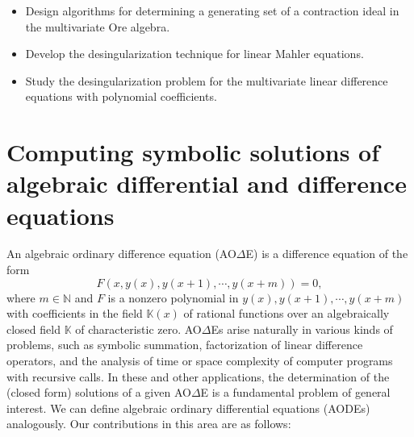 \documentclass[10pt,a4paper]{article}
\newcommand{\bK}{ {\mathbb  K}}
\newcommand{\AODE}{{AO{$\Delta$}E}}
\begin{document}
\begin{itemize}
\item Design algorithms for determining a generating set of a contraction ideal in the multivariate Ore algebra.

\item Develop the desingularization technique for linear Mahler equations. 

\item Study the desingularization problem for the multivariate linear difference equations with polynomial coefficients. 
\end{itemize}

\section*{Computing symbolic solutions of algebraic differential and difference equations}

An algebraic ordinary difference equation ({\AODE}) is a difference equation of the form
\[
F(x, y(x), y(x + 1), \cdots, y(x + m))=0,
\]
where $m \in \mathbb{N}$ and $F$ is a nonzero polynomial in $y(x), y(x + 1), \cdots, y(x + m)$ with coefficients in the field $\bK(x)$ of rational functions over an algebraically closed field $\bK$ of characteristic zero.
{\AODE}s arise naturally in various kinds of problems, such as symbolic summation, 
factorization of linear difference operators, and the 
analysis of time or space complexity of computer programs with recursive calls. 
In these and other applications, the determination of the (closed form) solutions of a given {\AODE}  is a fundamental problem of general interest. 
We can define algebraic ordinary differential equations (AODEs) analogously.  Our contributions in this area are as follows: 
\end{document}
